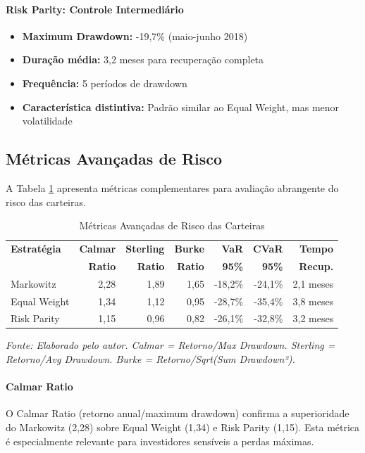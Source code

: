 \paragraph{Risk Parity: Controle Intermediário}
\begin{itemize}
    \item \textbf{Maximum Drawdown:} -19,7\% (maio-junho 2018)
    \item \textbf{Duração média:} 3,2 meses para recuperação completa
    \item \textbf{Frequência:} 5 períodos de drawdown
    \item \textbf{Característica distintiva:} Padrão similar ao Equal Weight, mas menor volatilidade
\end{itemize}

\subsection{Métricas Avançadas de Risco}

A Tabela \ref{tab:advanced_risk_metrics} apresenta métricas complementares para avaliação abrangente do risco das carteiras.

\begin{table}[H]
\centering
\caption{Métricas Avançadas de Risco das Carteiras}
\scriptsize
\begin{tabular}{|l|r|r|r|r|r|r|}
\hline
\textbf{Estratégia} & \textbf{Calmar} & \textbf{Sterling} & \textbf{Burke} & \textbf{VaR} & \textbf{CVaR} & \textbf{Tempo} \\
& \textbf{Ratio} & \textbf{Ratio} & \textbf{Ratio} & \textbf{95\%} & \textbf{95\%} & \textbf{Recup.} \\
\hline
Markowitz & 2,28 & 1,89 & 1,65 & -18,2\% & -24,1\% & 2,1 meses \\
\hline
Equal Weight & 1,34 & 1,12 & 0,95 & -28,7\% & -35,4\% & 3,8 meses \\
\hline
Risk Parity & 1,15 & 0,96 & 0,82 & -26,1\% & -32,8\% & 3,2 meses \\
\hline
\end{tabular}
\normalsize
\textit{Fonte: Elaborado pelo autor. Calmar = Retorno/Max Drawdown. Sterling = Retorno/Avg Drawdown. Burke = Retorno/Sqrt(Sum Drawdown²).}
\label{tab:advanced_risk_metrics}
\end{table}

\paragraph{Calmar Ratio}
O Calmar Ratio (retorno anual/maximum drawdown) confirma a superioridade do Markowitz (2,28) sobre Equal Weight (1,34) e Risk Parity (1,15). Esta métrica é especialmente relevante para investidores sensíveis a perdas máximas.


